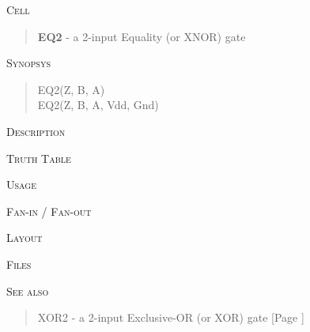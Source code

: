 
\label{EQ2}
\textsc{Cell}
\begin{quote}
    \textbf{EQ2} - a 2-input Equality (or XNOR) gate
\end{quote}

\textsc{Synopsys}
\begin{quote}
    EQ2(Z, B, A) \\
    EQ2(Z, B, A, Vdd, Gnd)
\end{quote}

\textsc{Description}

%

\textsc{Truth Table}


\textsc{Usage}

\textsc{Fan-in / Fan-out}

\textsc{Layout}

\textsc{Files}

\textsc{See also}
\begin{quote}
    XOR2 - a 2-input Exclusive-OR (or XOR) gate [Page \pageref{XOR2}]
\end{quote}
